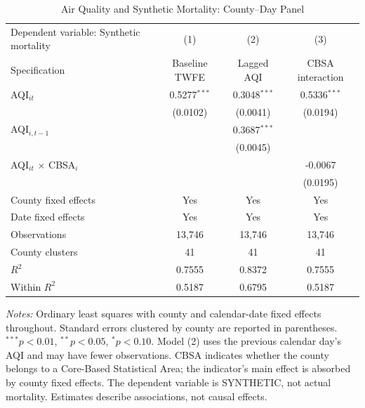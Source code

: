 \begin{table}[!htbp]
\centering
\caption{Air Quality and Synthetic Mortality: County--Day Panel}
\label{tab:pollution_mortality}
\small
\setlength{\tabcolsep}{8pt}
\begin{tabular}{lccc}
\toprule
Dependent variable: Synthetic mortality & (1) & (2) & (3) \\
Specification & Baseline TWFE & Lagged AQI & CBSA interaction \\
\midrule
AQI$_{it}$ & 0.5277$^{***}$ & 0.3048$^{***}$ & 0.5336$^{***}$ \\
 & (0.0102) & (0.0041) & (0.0194) \\
\addlinespace[3pt]
AQI$_{i,t-1}$ &  & 0.3687$^{***}$ &  \\
 &  & (0.0045) &  \\
\addlinespace[3pt]
AQI$_{it}$ $\times$ CBSA$_i$ &  &  & -0.0067 \\
 &  &  & (0.0195) \\
\addlinespace[6pt]
County fixed effects & Yes & Yes & Yes \\
Date fixed effects & Yes & Yes & Yes \\
Observations & 13,746 & 13,746 & 13,746 \\
County clusters & 41 & 41 & 41 \\
$R^2$ & 0.7555 & 0.8372 & 0.7555 \\
Within $R^2$ & 0.5187 & 0.6795 & 0.5187 \\
\bottomrule
\end{tabular}
\vspace{5pt}
\begin{minipage}{0.96\textwidth}
\footnotesize\emph{Notes:} Ordinary least squares with county and
calendar-date fixed effects throughout. Standard errors clustered by county
are reported in parentheses. $^{***}p<0.01$, $^{**}p<0.05$,
$^{*}p<0.10$. Model (2) uses the previous calendar day's AQI and may have
fewer observations. CBSA indicates whether the county belongs to a
Core-Based Statistical Area; the indicator's main effect is absorbed by
county fixed effects. The dependent variable is SYNTHETIC, not actual
mortality. Estimates describe associations, not causal effects.
\end{minipage}
\end{table}

